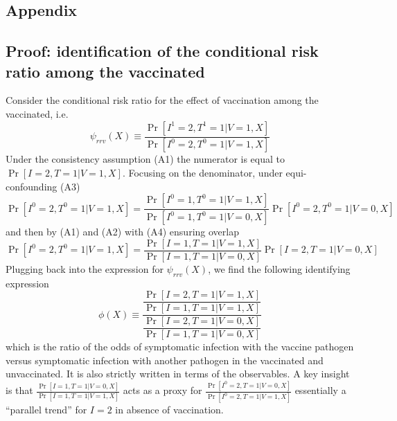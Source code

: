 
\begin{appendix}

    \renewcommand{\thefigure}{A\arabic{figure}}
    \setcounter{figure}{0}
    
    \renewcommand{\thetable}{A\arabic{table}}
    \setcounter{table}{0}
    
    \renewcommand{\theequation}{A\arabic{equation}}
    \setcounter{equation}{0}

    \newpage

    \section{Appendix}
    
    \subsection{Proof: identification of the conditional risk ratio among the vaccinated}
    Consider the conditional risk ratio for the effect of vaccination among the vaccinated, i.e.
    \begin{equation*}
        \psi_{rrv}(X) \equiv \dfrac{\Pr[I^1 = 2, T^1 = 1 | V = 1, X]}{\Pr[I^0 = 2, T^0 = 1 | V = 1, X]}
    \end{equation*}
    Under the consistency assumption (A1) the numerator is equal to $\Pr[I = 2, T = 1 | V = 1, X]$. Focusing on the denominator, under equi-confounding (A3)
    \begin{equation*}
    \Pr[I^0 = 2, T^0 = 1  | V = 1, X] = \frac{\Pr[I^0 = 1, T^0 = 1  | V = 1, X]}{\Pr[I^0 = 1, T^0 = 1  | V = 0, X]}\Pr[I^0 = 2, T^0 = 1 | V = 0, X]
    \end{equation*}
and then by (A1) and (A2) with (A4) ensuring overlap
    \begin{equation*}
     \Pr[I^0 = 2, T^0 = 1  | V = 1, X] = \frac{\Pr[I = 1, T = 1  | V = 1, X]}{\Pr[I = 1, T = 1  | V = 0, X]}\Pr[I = 2, T = 1 | V = 0, X]
    \end{equation*}
Plugging back into the expression for $\psi_{rrv}(X)$, we find the following identifying expression 
    \begin{equation*}
         \phi(X) \equiv \dfrac{\dfrac{\Pr[I = 2, T = 1 | V = 1, X]}{\Pr[I = 1, T = 1 | V = 1, X]}}{\dfrac{\Pr[I = 2, T = 1 | V = 0, X]}{\Pr[I = 1, T = 1 | V = 0, X]}}
    \end{equation*}
which is the ratio of the odds of symptomatic infection with the vaccine pathogen versus symptomatic infection with another pathogen in the vaccinated and unvaccinated. It is also strictly written in terms of the observables. A key insight is that $\frac{\Pr[I = 1, T =1  | V = 0, X]}{\Pr[I = 1, T = 1 | V = 1, X]}$ acts as a proxy for $\frac{\Pr[I^0 = 2, T =1  | V = 0, X]}{\Pr[I^0 = 2, T = 1 | V = 1, X]}$ essentially a ``parallel trend'' for $I=2$ in absence of vaccination.


\end{appendix}
